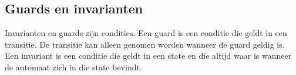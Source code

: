 \documentclass{article}
\begin{document}
	\subsection{Guards en invarianten}
	
	Invarianten en guards zijn condities.
	Een guard is een conditie die geldt in een transitie.   De
	transitie kan alleen genomen worden wanneer de guard geldig
	is.
	Een invariant is een conditie die geldt in een state en die altijd
	waar is wanneer de automaat zich in die state bevindt.	
	
\end{document}
